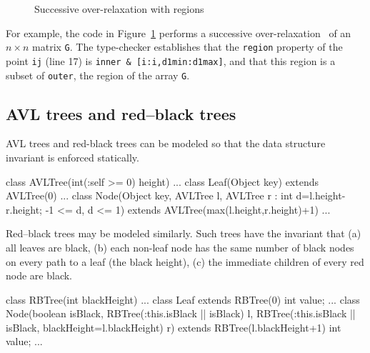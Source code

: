 \begin{figure}
\footnotesize


\caption{Successive over-relaxation with regions}
\label{fig:sor}
\end{figure}

For example, the code in Figure~\ref{fig:sor} performs a successive
over-relaxation~\cite{sor} of an $n \times n$ matrix {\tt G}.
The type-checker establishes that the {\tt region}
property of the point {\tt ij} (line 17) is
{\tt inner \& [i:i,d1min:d1max]}, and that this
region is a subset of {\tt outer}, the region of the array {\tt G}.

\subsection{AVL trees and red--black trees}

AVL trees and red-black trees can be modeled so that the
data structure invariant is enforced statically.

\begin{displayxten}
class AVLTree(int(:self >= 0) height) {...}
class Leaf(Object key) extends AVLTree(0) {...}
class Node(Object key, AVLTree l, AVLTree r
         : int d=l.height-r.height; -1 <= d, d <= 1) 
    extends AVLTree(max(l.height,r.height)+1) {...}
\end{displayxten}

Red--black trees may be modeled similarly. Such trees have the
invariant that (a) all leaves are black, (b) each non-leaf node has
the same number of black nodes on every path to a leaf (the black
height), (c) the immediate children of every red node are black.
\begin{displayxten}
class RBTree(int blackHeight) {...}
class Leaf extends RBTree(0) { int value; ... }
class Node(boolean isBlack, 
           RBTree(:this.isBlack || isBlack) l, 
           RBTree(:this.isBlack || isBlack,
                   blackHeight=l.blackHeight) r)
    extends RBTree(l.blackHeight+1) { int value; ... }
\end{displayxten}


